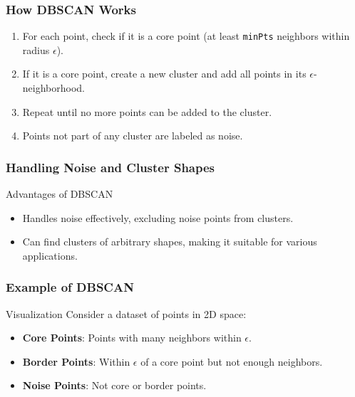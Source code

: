 \documentclass{beamer}
\begin{document}
\begin{frame}[fragile]
    \frametitle{How DBSCAN Works}
    \begin{enumerate}
        \item For each point, check if it is a core point (at least \texttt{minPts} neighbors within radius $\epsilon$).
        \item If it is a core point, create a new cluster and add all points in its $\epsilon$-neighborhood.
        \item Repeat until no more points can be added to the cluster.
        \item Points not part of any cluster are labeled as noise.
    \end{enumerate}
\end{frame}

\begin{frame}[fragile]
    \frametitle{Handling Noise and Cluster Shapes}
    \begin{block}{Advantages of DBSCAN}
        \begin{itemize}
            \item Handles noise effectively, excluding noise points from clusters.
            \item Can find clusters of arbitrary shapes, making it suitable for various applications.
        \end{itemize}
    \end{block}
\end{frame}

\begin{frame}[fragile]
    \frametitle{Example of DBSCAN}
    \begin{block}{Visualization}
        Consider a dataset of points in 2D space:
        \begin{itemize}
            \item \textbf{Core Points}: Points with many neighbors within $\epsilon$.
            \item \textbf{Border Points}: Within $\epsilon$ of a core point but not enough neighbors.
            \item \textbf{Noise Points}: Not core or border points.
        \end{itemize}
    \end{block}
\end{frame}
\end{document}
